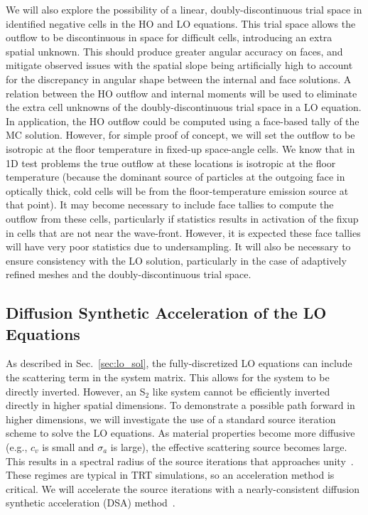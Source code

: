 \documentclass[11pt]{article}
\begin{document}
We will also explore the possibility of a linear, doubly-discontinuous trial space in
identified negative cells in the HO
and LO equations.  This trial space allows
the outflow to be discontinuous in space for difficult cells, introducing an extra
spatial unknown. This should produce greater
angular accuracy on faces, and mitigate observed issues with the spatial slope being
artificially high to account for the discrepancy in angular shape between the
internal and face solutions. A relation between the HO outflow and internal moments
will be used to eliminate the extra cell unknowns of the doubly-discontinuous trial
space in a LO equation.  In application, the HO outflow could be computed using a
face-based tally of the MC solution.  However, for simple proof of concept, we will
set the outflow to be isotropic at the floor temperature in fixed-up space-angle cells.  We know
that in 1D test problems the true outflow at these locations is isotropic
at the floor temperature (because the dominant source of particles at the outgoing face in
optically thick, cold cells will be from the floor-temperature emission source at
that point).  It may become necessary to include face tallies to
compute the outflow from these cells, particularly if statistics results in
activation of the fixup in cells that are not near the wave-front.  However, it is
expected these face tallies will have very poor statistics due to undersampling.
It will also be necessary to ensure consistency with the LO
solution, particularly in the case of adaptively refined meshes and the
doubly-discontinuous trial space.  

\subsection{Diffusion Synthetic Acceleration of the LO Equations}

As described in Sec.~\ref{sec:lo_sol}, the fully-discretized LO equations can include
the scattering term in the system matrix.  This allows for the system to be directly
inverted.
However, an S$_2$ like system cannot be efficiently inverted
directly in higher spatial dimensions.  To demonstrate a possible path forward in
higher dimensions, we will investigate the use of a standard
source iteration scheme to solve the LO equations.  As
material properties become more diffusive (e.g., $c_v$ is small and $\sigma_a$ is
large), the effective scattering source becomes large.  This results in a spectral radius of the source iterations that approaches
unity~\cite{morel_newton}.  These regimes are typical in TRT simulations, so an
acceleration method is critical.  We will accelerate the source iterations with a nearly-consistent diffusion synthetic acceleration
(DSA) method~\cite{wla,wla_thesis}.
\end{document}

